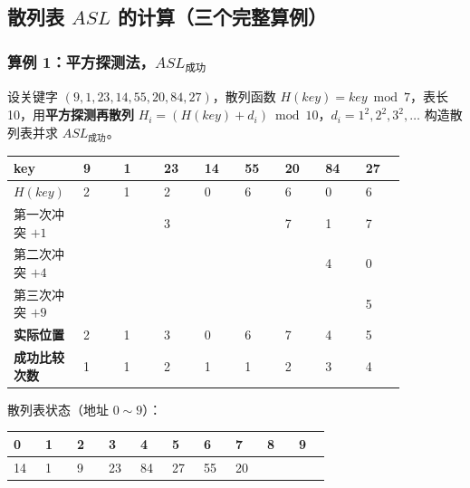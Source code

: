 \documentclass[11pt,openany,UTF8]{ctexbook}
\begin{document}
\subsection{散列表 $ASL$ 的计算（三个完整算例）}

\subsubsection{算例 1：平方探测法，$ASL_{成功}$}

设关键字 $(9,1,23,14,55,20,84,27)$，散列函数 $H(key)=key\bmod 7$，表长 10，用\textbf{平方探测再散列} $H_i=(H(key)+d_i)\bmod 10$，$d_i=1^2,2^2,3^2,\ldots$ 构造散列表并求 $ASL_{成功}$。

\begingroup\footnotesize\setlength{\tabcolsep}{3.0pt}
\begin{longtable}{@{}L{0.1050\linewidth}L{0.0949\linewidth}L{0.0949\linewidth}L{0.0949\linewidth}L{0.0949\linewidth}L{0.0949\linewidth}L{0.0949\linewidth}L{0.0949\linewidth}L{0.0949\linewidth}@{}}
\toprule
\textbf{key} & \textbf{9} & \textbf{1} & \textbf{23} & \textbf{14} & \textbf{55} & \textbf{20} & \textbf{84} & \textbf{27} \\
\midrule
\endhead
$H(key)$ & 2 & 1 & 2 & 0 & 6 & 6 & 0 & 6 \\
第一次冲突 $+1$ &  &  & 3 &  &  & 7 & 1 & 7 \\
第二次冲突 $+4$ &  &  &  &  &  &  & 4 & 0 \\
第三次冲突 $+9$ &  &  &  &  &  &  &  & 5 \\
\textbf{实际位置} & 2 & 1 & 3 & 0 & 6 & 7 & 4 & 5 \\
\textbf{成功比较次数} & 1 & 1 & 2 & 1 & 1 & 2 & 3 & 4 \\
\bottomrule
\end{longtable}
\endgroup

散列表状态（地址 $0\sim9$）：

\begingroup\footnotesize\setlength{\tabcolsep}{2.0pt}
\begin{longtable}{@{}L{0.0894\linewidth}L{0.0894\linewidth}L{0.0894\linewidth}L{0.0894\linewidth}L{0.0894\linewidth}L{0.0894\linewidth}L{0.0894\linewidth}L{0.0894\linewidth}L{0.0894\linewidth}L{0.0894\linewidth}@{}}
\toprule
\textbf{0} & \textbf{1} & \textbf{2} & \textbf{3} & \textbf{4} & \textbf{5} & \textbf{6} & \textbf{7} & \textbf{8} & \textbf{9} \\
\midrule
{} & 1 & 9 & 23 & 84 & 27 & 55 & 20 &  &  \\
\bottomrule
\end{longtable}
\endgroup
\end{document}
